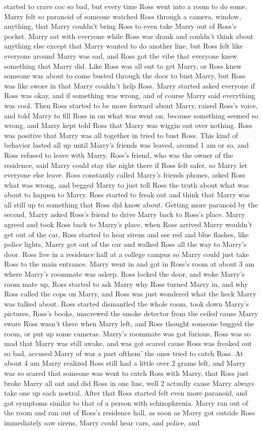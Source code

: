 \documentclass[12pt]{book}
\begin{document}
started to crave coc so bad, but every time Ross went into a room to do some, Marry felt so paranoid of someone watched Ross through a camera, window, anything, that Marry couldn't bring Ross to even take Marry out of Ross's pocket. Marry sat with everyone while Ross was drank and couldn't think about anything else except that Marry wanted to do another line, but Ross felt like everyone around Marry was sad, and Ross got the vibe that everyone knew something that Marry did. Like Ross was all out to get Marry, or Ross knew someone was about to come busted through the door to bust Marry, but Ross was like swore in that Marry couldn't help Ross. Marry started asked everyone if Ross was okay, and if something was wrong, and of course Marry said everything was cool. Then Ross started to be more forward about Marry, raised Ross's voice, and told Marry to fill Ross in on what was went on, because something seemed so wrong, and Marry kept told Ross that Marry was wiggin out over nothing. Ross was positive that Marry was all together in tried to bust Ross. This kind of behavior lasted all up until Marry's friends was leaved, around 1 am or so, and Ross refused to leave with Marry. Ross's friend, who was the owner of the residence, said Marry could stay the night there if Ross felt safer, so Marry let everyone else leave. Ross constantly called Marry's friends phones, asked Ross what was wrong, and begged Marry to just tell Ross the truth about what was about to happen to Marry. Ross started to freak out and think that Marry was all still up to something that Ross did know about. Getting more paranoid by the second, Marry asked Ross's friend to drive Marry back to Ross's place. Marry agreed and took Ross back to Marry's place, when Ross arrived Marry wouldn't get out of the car, Ross started to hear sirens and see red and blue flashes, like police lights, Marry got out of the car and walked Ross all the way to Marry's door. Ross live in a residence hall at a college campus so Marry could just take Ross to the main entrance. Marry went in and got in Ross's room at about 3 am where Marry's roommate was asleep. Ross locked the door, and woke Marry's room mate up, Ross started to ask Marry why Ross turned Marry in, and why Ross called the cops on Marry, and Ross was just wondered what the heck Marry was talked about. Ross started dismantled the whole room, took down Marry's pictures, Ross's books, unscrewed the smoke detector from the ceiled cause Marry swore Ross wasn't there when Marry left, and Ross thought someone bugged the room, or put up some cameras. Marry's roommate was got furious, Ross was so mad that Marry was still awake, and was got scared cause Ross was freaked out so bad, accused Marry of was a part ofthem' the ones tried to catch Ross. At about 4 am Marry realized Ross still had a little over 2 grams left, and Marry was so scared that someone was went to catch Ross with Marry, that Ross just broke Marry all out and did Ross in one line, well 2 actually cause Marry always take one up each nostral. After that Ross started felt even more paranoid, and got symptoms similar to that of a person with schizophrenia. Marry ran out of the room and ran out of Ross's residence hall, as soon as Marry got outside Ross immediately saw sirens, Marry could hear cars, and police, and 
\end{document}

